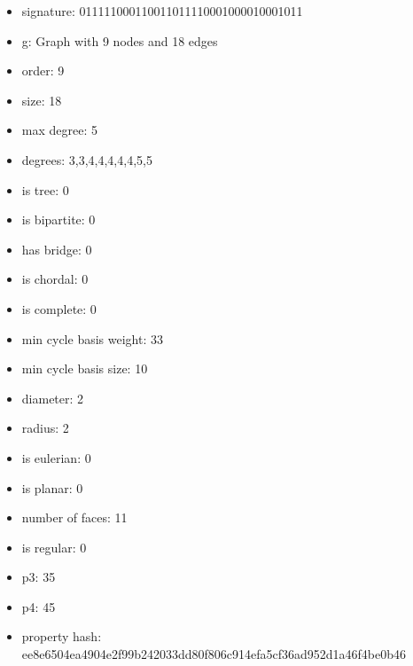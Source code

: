 \newpage
\begin{figure}
\end{figure}
\begin{itemize}
\item signature: 011111000110011011110001000010001011
\item g: Graph with 9 nodes and 18 edges
\item order: 9
\item size: 18
\item max degree: 5
\item degrees: 3,3,4,4,4,4,4,5,5
\item is tree: 0
\item is bipartite: 0
\item has bridge: 0
\item is chordal: 0
\item is complete: 0
\item min cycle basis weight: 33
\item min cycle basis size: 10
\item diameter: 2
\item radius: 2
\item is eulerian: 0
\item is planar: 0
\item number of faces: 11
\item is regular: 0
\item p3: 35
\item p4: 45
\item property hash: ee8e6504ea4904e2f99b242033dd80f806c914efa5cf36ad952d1a46f4be0b46
\end{itemize}

